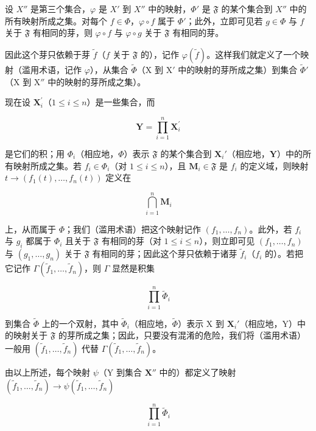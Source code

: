 设 \(X''\) 是第三个集合，\(\varphi\) 是 \(X'\) 到 \(X''\) 中的映射，\(\Phi'\) 是 \(\mathfrak{F}\) 的某个集合到 \(X''\) 中的所有映射所成之集。对每个 \(f \in \Phi\)，\(\varphi \circ f\) 属于 \(\Phi'\)；此外，立即可见若 \(g \in \Phi\) 与 \(f\) 关于 \(\mathfrak{F}\) 有相同的芽，则 \(\varphi \circ f\) 与 \(\varphi \circ g\) 关于 \(\mathfrak{F}\) 有相同的芽。

因此这个芽只依赖于芽 \(\tilde{f}\)（\(f\) 关于 \(\mathfrak{F}\) 的），记作 \(\varphi(\tilde{f})\)。这样我们就定义了一个映射（滥用术语，记作 \(\varphi\)），从集合 \(\tilde{\Phi}\)（X 到 \(\mathrm{X}'\) 中的映射的芽所成之集）到集合 \(\tilde{\Phi}'\)（X 到 \(\mathrm{X}''\) 中的映射的芽所成之集）。

现在设 \(\mathbf{X}_i^{\prime}\)（\(1 \leqslant i \leqslant n\)）是一些集合，而

\[
\mathbf {Y} = \prod_ {i = 1} ^ {n} \mathbf {X} _ {i} ^ {\prime}
\]

是它们的积；用 \(\Phi_i\)（相应地，\(\Phi\)）表示 \(\mathfrak{F}\) 的某个集合到 \(\mathbf{X}_i'\)（相应地，\(\mathbf{Y}\)）中的所有映射所成之集。若 \(f_i \in \Phi_i\)（对 \(1 \leqslant i \leqslant n\)），且 \(\mathbf{M}_i \in \mathfrak{F}\) 是 \(f_i\) 的定义域，则映射 \(t \to (f_1(t), \ldots, f_n(t))\) 定义在

\[
\bigcap_ {i = 1} ^ {n} \mathbf {M} _ {i}
\]

上，从而属于 \(\Phi\)；我们（滥用术语）把这个映射记作 \((f_1, \ldots, f_n)\)。此外，若 \(f_i\) 与 \(g_i\) 都属于 \(\Phi_i\) 且关于 \(\mathfrak{F}\) 有相同的芽（对 \(1 \leqslant i \leqslant n\)），则立即可见 \((f_1, \ldots, f_n)\) 与 \((g_1, \ldots, g_n)\) 关于 \(\mathfrak{F}\) 有相同的芽；因此这个芽只依赖于诸芽 \(\tilde{f}_i\)（\(f_i\) 的）。若把它记作 \(\Gamma(\tilde{f}_1, \ldots, \tilde{f}_n)\)，则 \(\Gamma\) 显然是积集

\[
\prod_ {i = 1} ^ {n} \tilde {\Phi} _ {i}
\]

到集合 \(\tilde{\Phi}\) 上的一个双射，其中 \(\tilde{\Phi}_i\)（相应地，\(\tilde{\Phi}\)）表示 X 到 \(\mathbf{X}_i'\)（相应地，Y）中的映射关于 \(\mathfrak{F}\) 的芽所成之集；因此，只要没有混淆的危险，我们将（滥用术语）一般用 \((\tilde{f}_1, \ldots, \tilde{f}_n)\) 代替 \(\Gamma(\tilde{f}_1, \ldots, \tilde{f}_n)\)。

由以上所述，每个映射 \(\psi\)（Y 到集合 \(\mathbf{X}''\) 中的）都定义了映射 \((\tilde{f}_1, \ldots, \tilde{f}_n) \to \psi(\tilde{f}_1, \ldots, \tilde{f}_n)\)

\[
\prod_ {i = 1} ^ {n} \tilde {\Phi} _ {i}
\]

